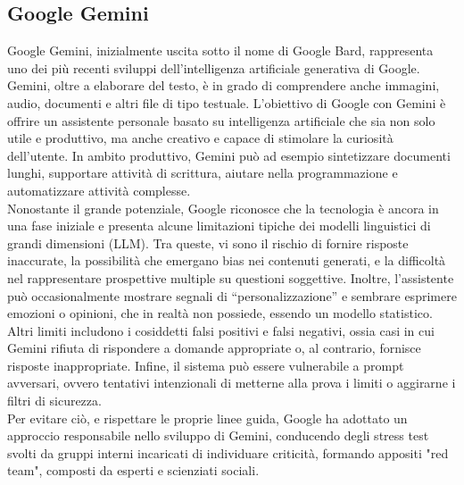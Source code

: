 \subsection{Google Gemini}
Google Gemini, inizialmente uscita sotto il nome di Google Bard, rappresenta uno dei più recenti sviluppi dell'intelligenza artificiale generativa di Google. Gemini, oltre a elaborare del testo, è in grado di comprendere anche immagini, audio, documenti e altri file di tipo testuale.
L'obiettivo di Google con Gemini è offrire un assistente personale basato su intelligenza artificiale che sia non solo utile e produttivo, ma anche creativo e capace di stimolare la curiosità dell'utente. In ambito produttivo, Gemini può ad esempio sintetizzare documenti lunghi, supportare attività di scrittura, aiutare nella programmazione e automatizzare attività complesse.\\
Nonostante il grande potenziale, Google riconosce che la tecnologia è ancora in una fase iniziale e presenta alcune limitazioni tipiche dei modelli linguistici di grandi dimensioni (LLM). Tra queste, vi sono il rischio di fornire risposte inaccurate, la possibilità che emergano bias nei contenuti generati, e la difficoltà nel rappresentare prospettive multiple su questioni soggettive. Inoltre, l'assistente può occasionalmente mostrare segnali di “personalizzazione” e sembrare esprimere emozioni o opinioni, che in realtà non possiede, essendo un modello statistico. Altri limiti includono i cosiddetti falsi positivi e falsi negativi, ossia casi in cui Gemini rifiuta di rispondere a domande appropriate o, al contrario, fornisce risposte inappropriate. Infine, il sistema può essere vulnerabile a prompt avversari, ovvero tentativi intenzionali di metterne alla prova i limiti o aggirarne i filtri di sicurezza.\\
Per evitare ciò, e rispettare le proprie linee guida, Google ha adottato un approccio responsabile nello sviluppo di Gemini, conducendo degli stress test svolti da gruppi interni incaricati di individuare criticità, formando appositi "red team", composti da esperti e scienziati sociali.\cite{GeminiLaunch} \cite{GeminiAppOverview}
